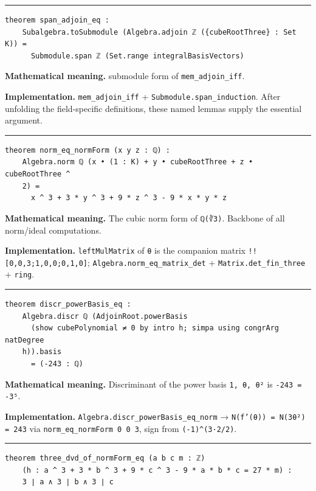 \documentclass[UTF8,a4paper,11pt,fontset=fandol]{ctexart}
\theoremstyle{definition}
\newcommand{\statementsep}{\par\medskip\hrule\medskip}
\begin{document}
\statementsep
\begin{verbatim}
theorem span_adjoin_eq :
    Subalgebra.toSubmodule (Algebra.adjoin ℤ ({cubeRootThree} : Set K)) =
      Submodule.span ℤ (Set.range integralBasisVectors)
\end{verbatim}
\noindent\textbf{Mathematical meaning.} submodule form of \texttt{mem\_\allowbreak{}adjoin\_\allowbreak{}iff}.\par
\noindent\textbf{Implementation.} \texttt{mem\_\allowbreak{}adjoin\_\allowbreak{}iff} + \texttt{Submodule.\allowbreak{}span\_\allowbreak{}induction}. After unfolding the field-specific definitions, these named lemmas supply the essential argument.\par
\statementsep
\begin{verbatim}
theorem norm_eq_normForm (x y z : ℚ) :
    Algebra.norm ℚ (x • (1 : K) + y • cubeRootThree + z • cubeRootThree ^
    2) =
      x ^ 3 + 3 * y ^ 3 + 9 * z ^ 3 - 9 * x * y * z
\end{verbatim}
\noindent\textbf{Mathematical meaning.} The cubic norm form of \texttt{ℚ(∛3)}. Backbone of all norm/ideal computations.\par
\noindent\textbf{Implementation.} \texttt{leftMulMatrix} of \texttt{θ} is the companion matrix \texttt{!![0,0,3;1,0,0;0,1,0]}; \texttt{Algebra.\allowbreak{}norm\_\allowbreak{}eq\_\allowbreak{}matrix\_\allowbreak{}det} + \texttt{Matrix.\allowbreak{}det\_\allowbreak{}fin\_\allowbreak{}three} + \texttt{ring}.\par
\statementsep
\begin{verbatim}
theorem discr_powerBasis_eq :
    Algebra.discr ℚ (AdjoinRoot.powerBasis
      (show cubePolynomial ≠ 0 by intro h; simpa using congrArg natDegree
    h)).basis
      = (-243 : ℚ)
\end{verbatim}
\noindent\textbf{Mathematical meaning.} Discriminant of the power basis \texttt{1, θ, θ²} is \texttt{-243 = -3⁵}.\par
\noindent\textbf{Implementation.} \texttt{Algebra.\allowbreak{}discr\_\allowbreak{}powerBasis\_\allowbreak{}eq\_\allowbreak{}norm} → \texttt{N(f'(θ)) = N(3θ²) = 243} via \texttt{norm\_\allowbreak{}eq\_\allowbreak{}normForm 0 0 3}, sign from \texttt{(-1)\textasciicircum{}(3·2/\allowbreak{}2)}.\par
\statementsep
\begin{verbatim}
theorem three_dvd_of_normForm_eq (a b c m : ℤ)
    (h : a ^ 3 + 3 * b ^ 3 + 9 * c ^ 3 - 9 * a * b * c = 27 * m) :
    3 ∣ a ∧ 3 ∣ b ∧ 3 ∣ c
\end{verbatim}
\end{document}
